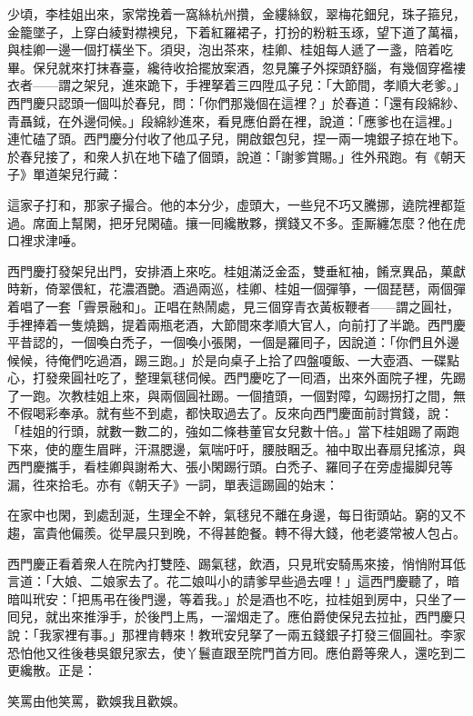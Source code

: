 少頃，李桂姐出來，家常挽着一窩絲杭州攢，金縷絲釵，翠梅花鈿兒，珠子箍兒，金籠墜子，上穿白綾對襟襖兒，下着紅羅裙子，打扮的粉粧玉琢，望下道了萬福，與桂卿一邊一個打橫坐下。須臾，泡出茶來，桂卿、桂姐每人遞了一盞，陪着吃畢。保兒就來打抹春臺，纔待收拾擺放案酒，忽見簾子外探頭舒腦，有幾個穿襤褸衣者——謂之架兒，{}進來跪下，手裡拏着三四陞瓜子兒：「大節間，孝順大老爹。」西門慶只認頭一個叫於春兒，問：「你們那幾個在這裡？」於春道：「還有段綿紗、青聶鉞，在外邊伺候。」段綿紗進來，看見應伯爵在裡，說道：「應爹也在這裡。」連忙磕了頭。西門慶分付收了他瓜子兒，開啟銀包兒，捏一兩一塊銀子掠在地下。於春兒接了，和衆人扒在地下磕了個頭，說道：「謝爹賞賜。」徃外飛跑。有《朝天子》單道架兒行藏：

這家子打和，那家子撮合。他的本分少，虛頭大，一些兒不巧又騰挪，遶院裡都踅過。席面上幫閑，把牙兒閑磕。攘一囘纔散夥，{}撰錢又不多。歪厮纏怎麼？他在虎口裡求津唾。

西門慶打發架兒出門，安排酒上來吃。桂姐滿泛金盃，雙垂紅袖，餚烹異品，菓獻時新，倚翠偎紅，花濃酒艷。酒過兩巡，桂卿、桂姐一個彈箏，一個琵琶，兩個彈着唱了一套「霽景融和」。正唱在熱鬧處，見三個穿青衣黃板鞭者——謂之圓社，手裡捧着一隻燒鵝，提着兩瓶老酒，大節間來孝順大官人，向前打了半跪。西門慶平昔認的，一個喚白禿子，一個喚小張閑，一個是羅囘子，{}因說道：「你們且外邊候候，待俺們吃過酒，踢三跑。」於是向桌子上拾了四盤嗄飯、一大壺酒、一碟點心，打發衆圓社吃了，整理氣毬伺候。西門慶吃了一囘酒，出來外面院子裡，先踢了一跑。次教桂姐上來，與兩個圓社踢。一個揸頭，一個對障，勾踢拐打之間，無不假喝彩奉承。就有些不到處，都快取過去了。反來向西門慶面前討賞錢，說：「桂姐的行頭，就數一數二的，強如二條巷董官女兒數十倍。」當下桂姐踢了兩跑下來，使的塵生眉畔，汗濕腮邊，氣喘吁吁，腰肢睏乏。袖中取出春扇兒搖涼，與西門慶攜手，看桂卿與謝希大、張小閑踢行頭。白禿子、羅囘子在旁虛撮脚兒等漏，徃來拾毛。亦有《朝天子》一詞，單表這踢圓的始末：

在家中也閑，到處刮涎，生理全不幹，{}氣毬兒不離在身邊，每日街頭站。窮的又不趨，富貴他偏羨。從早晨只到晚，不得甚飽餐。轉不得大錢，他老婆常被人包占。

西門慶正看着衆人在院內打雙陸、踢氣毬，飲酒，只見玳安騎馬來接，悄悄附耳低言道：「大娘、二娘家去了。花二娘叫小的請爹早些過去哩！」這西門慶聽了，暗暗叫玳安：「把馬弔在後門邊，等着我。」於是酒也不吃，拉桂姐到房中，只坐了一囘兒，就出來推淨手，於後門上馬，一溜烟走了。應伯爵使保兒去拉扯，西門慶只說：「我家裡有事。」那裡肯轉來！教玳安兒拏了一兩五錢銀子打發三個圓社。李家恐怕他又徃後巷吳銀兒家去，使丫鬟直跟至院門首方囘。應伯爵等衆人，還吃到二更纔散。正是：

笑罵由他笑罵，歡娛我且歡娛。

